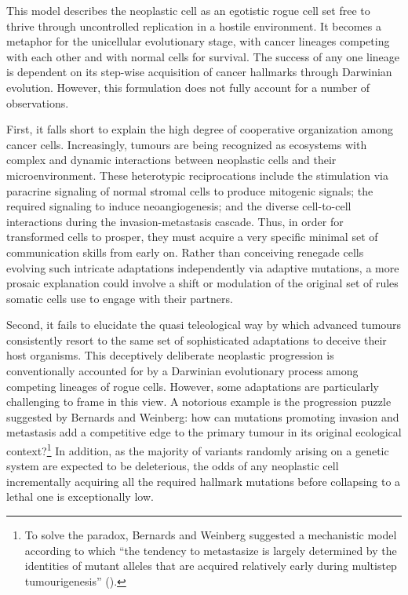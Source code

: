 This model describes the neoplastic cell as an egotistic rogue cell set free to
thrive through uncontrolled replication in a hostile environment.  It becomes a
metaphor for the unicellular evolutionary stage, with cancer lineages competing
with each other and with normal cells for survival.\cite{merlo_cancer_2006} The
success of any one lineage is dependent on its \mbox{step-wise} acquisition of
cancer hallmarks through Darwinian evolution.  However, this formulation does
not fully account for a number of observations.\cite{davies_cancer_2011}

First, it falls short to explain the high degree of cooperative organization
among cancer cells.  Increasingly, tumours are being recognized as ecosystems
with complex and dynamic interactions between neoplastic cells and their
microenvironment.\cite{polyak_co-evolution_2009} These heterotypic
reciprocations include the stimulation via paracrine signaling of normal stromal
cells to produce mitogenic signals; the required signaling to induce
neoangiogenesis; and the diverse cell-to-cell interactions during the
invasion-metastasis cascade.\cite{axelrod_evolution_2006} Thus, in order for
transformed cells to prosper, they must acquire a very specific minimal set of
communication skills from early on.  Rather than conceiving renegade cells
evolving such intricate adaptations independently via adaptive mutations, a more
prosaic explanation could involve a shift or modulation of the original set of
rules somatic cells use to engage with their partners.

Second, it fails to elucidate the quasi teleological way by which advanced
tumours consistently resort to the same set of sophisticated adaptations to
deceive their host organisms.\cite{hanahan_hallmarks_2011}
This deceptively deliberate neoplastic progression is conventionally accounted
for by a Darwinian evolutionary process among competing lineages of rogue
cells.\cite{merlo_cancer_2006} However, some adaptations are particularly
challenging to frame in this view.  A notorious example is the progression
puzzle suggested by Bernards and Weinberg: how can mutations promoting invasion
and metastasis add a competitive edge to the primary tumour in its original
ecological context?\footnote{To solve the paradox, Bernards and Weinberg
  suggested a mechanistic model according to which ``the tendency to metastasize
  is largely determined by the identities of mutant alleles that are acquired
  relatively early during multistep tumourigenesis''
  (\citealp{bernards_progression_2002}).}  In addition, as the majority of
variants randomly arising on a genetic system are expected to be deleterious,
the odds of any neoplastic cell incrementally acquiring all the required
hallmark mutations before collapsing to a lethal one is exceptionally low.

